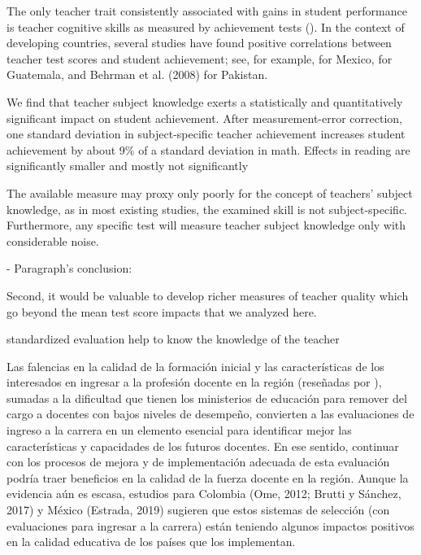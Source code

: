 The only teacher trait consistently associated with gains in student performance is teacher cognitive skills as measured by achievement tests (\citep{Hanushek_et_al_2006, Rockoff_et_al_2011}). In the context of developing countries, several studies have found positive correlations between teacher test scores and student achievement; see, for example, \citep{Santibanez_2006} for Mexico, \citep{Marshall_2009} for Guatemala, and Behrman et al. (2008) for Pakistan.


We find that teacher subject knowledge exerts a statistically and quantitatively significant impact on student achievement. After measurement-error correction, one standard deviation in subject-specific teacher achievement increases student achievement by about 9\% of a standard deviation in math. Effects in reading are significantly smaller and mostly not significantly \citep{Metzler_et_al_2012}


The available measure may proxy only poorly for the concept of teachers' subject knowledge, as in most existing studies, the examined skill is not subject-specific. Furthermore, any specific test will measure teacher subject knowledge only with considerable noise. \citep{Metzler_et_al_2012}



- Paragraph's conclusion: 

Second, it would be valuable to develop richer measures of teacher quality which go beyond the mean test score impacts that we analyzed here. \citep{Chetty_et_al_2014a}

standardized evaluation help to know the knowledge of the teacher

\citep{Hincapie_et_al_2020}
Las falencias en la calidad de la formación inicial y las características de los interesados
en ingresar a la profesión docente en la región (reseñadas por \citep{Elacqua_et_al_2018}), sumadas a la dificultad que tienen los ministerios de educación para remover del cargo a docentes con bajos niveles de desempeño, convierten a las evaluaciones de ingreso a la carrera en un elemento esencial para identificar mejor las características y capacidades de los futuros docentes. En ese sentido, continuar con los procesos de mejora y de implementación adecuada de esta evaluación podría traer beneficios en la calidad de la fuerza docente en la región. Aunque la evidencia aún es escasa, estudios para Colombia (Ome, 2012; Brutti y Sánchez, 2017) y México (Estrada, 2019) sugieren que estos sistemas de selección (con evaluaciones para ingresar a la carrera) están teniendo algunos impactos positivos en la calidad educativa de los países que los implementan.



